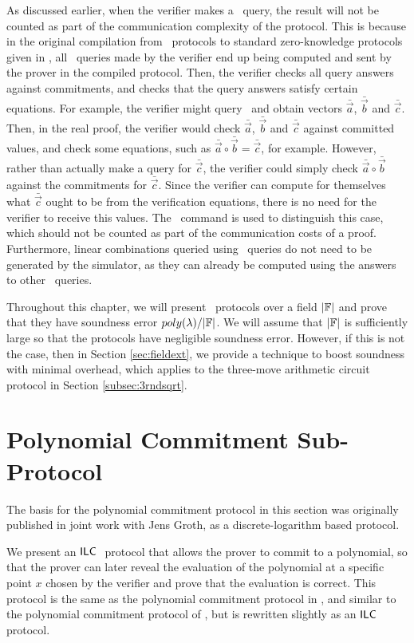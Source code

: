 As discussed earlier, when the verifier makes a \ILCcheck\ query, the result will not be counted as part of the communication complexity of the protocol. This is because in the original compilation from \ILC\ protocols to standard zero-knowledge protocols given in \cite{BootleCGGHJ17}, all \ILCopen\ queries made by the verifier end up being computed and sent by the prover in the compiled protocol. Then, the verifier checks all query answers against commitments, and checks that the query answers satisfy certain equations. For example, the verifier might query \ILC\ and obtain vectors $\bar{\vec{a}}$, $\bar{\vec{b}}$ and $\bar{\vec{c}}$. Then, in the real proof, the verifier would check $\bar{\vec{a}}$, $\bar{\vec{b}}$ and $\bar{\vec{c}}$ against committed values, and check some equations, such as $\bar{\vec{a}} \circ \bar{\vec{b}} = \bar{\vec{c}}$, for example. However, rather than actually make a query for $\bar{\vec{c}}$, the verifier could simply check $\bar{\vec{a}} \circ \bar{\vec{b}}$ against the commitments for $\bar{\vec{c}}$. Since the verifier can compute for themselves what $\bar{\vec{c}}$ ought to be from the verification equations, there is no need for the verifier to receive this values. The \ILCcheck\ command is used to distinguish this case, which should not be counted as part of the communication costs of a proof. Furthermore, linear combinations queried using \ILCcheck\ queries do not need to be generated by the simulator, as they can already be computed using the answers to other \ILCopen\ queries.

Throughout this chapter, we will present \ILC \ protocols over a field $|\mathbb{F}|$ and prove that they have soundness error $poly(\lambda) / |\mathbb{F}|$. We will assume that $|\mathbb{F}|$ is sufficiently large so that the protocols have negligible soundness error. However, if this is not the case, then in Section \ref{sec:fieldext}, we provide a technique to boost soundness with minimal overhead, which applies to the three-move arithmetic circuit protocol in Section \ref{subsec:3rndsqrt}.

\section{Polynomial Commitment Sub-Protocol} \label{subsec:polycommit}

The basis for the polynomial commitment protocol in this section was originally published in joint work \cite{BootleG18} with Jens Groth, as a discrete-logarithm based protocol.

We present an $\mathsf{ILC}~$ protocol that allows the prover to commit to a polynomial, so that the prover can later reveal the evaluation of the polynomial at a specific point $x$ chosen by the verifier and prove that the evaluation is correct. This protocol is the same as the polynomial commitment protocol in \cite{BootleG18}, and similar to the polynomial commitment protocol of \cite{BootleCCGP16}, but is rewritten slightly as an $\mathsf{ILC}~$ protocol.

